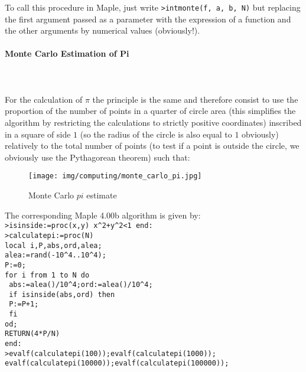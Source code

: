 	To call this procedure in Maple, just write \texttt{>intmonte(f, a, b, N)} but replacing the first argument passed as a parameter with the expression of a function and the other arguments by numerical values (obviously!).
	
	\paragraph{Monte Carlo Estimation of Pi}\mbox{}\\\\
	For the calculation of $\pi$ the principle is the same and therefore consist to use the proportion of the number of points in a quarter of circle area (this simplifies the algorithm by restricting the calculations to strictly positive coordinates) inscribed in a square of side $1$ (so the radius of the circle is also equal to $1$ obviously) relatively to the total number of points (to test if a point is outside the circle, we obviously use the Pythagorean theorem) such that:
	
	\begin{figure}[H]
		\centering
		\texttt{[image: img/computing/monte\_carlo\_pi.jpg]}
		\caption{Monte Carlo $pi$ estimate}
	\end{figure}
	The corresponding Maple 4.00b algorithm is given by:\\

	\texttt{>isinside:=proc(x,y) x\string^2+y\string^2<1 end:}\\
	\texttt{>calculatepi:=proc(N)}\\
	\texttt{local i,P,abs,ord,alea;}\\
	\texttt{alea:=rand(-10\string^4..10\string^4);}\\
	\texttt{P:=0;}\\
	\texttt{for i from 1 to N do}\\
	\texttt{     abs:=alea()/10\string^4;ord:=alea()/10\string^4;}\\
	\texttt{       if isinside(abs,ord) then}\\
	\texttt{            P:=P+1;}\\
	\texttt{       fi}\\
	\texttt{od;}\\
	\texttt{RETURN(4*P/N)}\\
	\texttt{end:}\\
	\texttt{>evalf(calculatepi(100));evalf(calculatepi(1000));\\evalf(calculatepi(10000));evalf(calculatepi(100000));}\\
	
